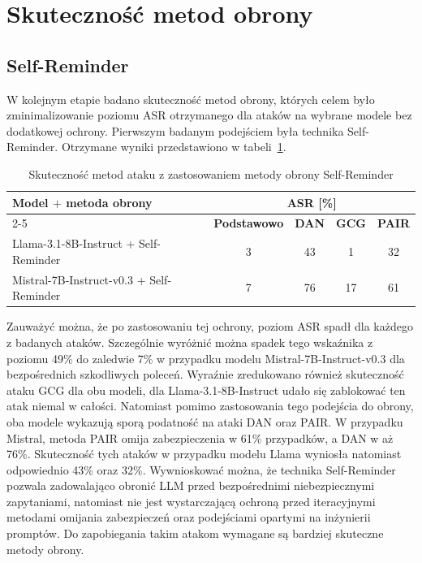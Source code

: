 \section{Skuteczność metod obrony}
\subsection{Self-Reminder}
W kolejnym etapie badano skuteczność metod obrony, których celem było zminimalizowanie poziomu \gls{ASR} otrzymanego dla ataków na wybrane modele bez dodatkowej ochrony. Pierwszym badanym podejściem była technika Self-Reminder. Otrzymane wyniki przedstawiono w tabeli~\ref{tab:self_reminder_comparison_tab}.
\begin{table}[!ht]
    \centering
    \renewcommand{\arraystretch}{1.2}
    \begin{tabular}{l|c|c|c|c}
        \hline
        \multirow{2}{*}{\textbf{Model $+$ metoda obrony}} & \multicolumn{4}{c}{\textbf{ASR [\%]}}                                               \\\cline{2-5}
                                                          & \textbf{Podstawowo}                   & \textbf{DAN} & \textbf{GCG} & \textbf{PAIR} \\\hline
        Llama-3.1-8B-Instruct + Self-Reminder             & 3                                     & 43           & 1            & 32            \\\hline
        Mistral-7B-Instruct-v0.3 + Self-Reminder          & 7                                     & 76           & 17           & 61            \\\hline
    \end{tabular}
    \caption{\label{tab:self_reminder_comparison_tab}Skuteczność metod ataku z zastosowaniem metody obrony Self-Reminder}
\end{table}
Zauważyć można, że po zastosowaniu tej ochrony, poziom \gls{ASR} spadł dla każdego z badanych ataków. Szczególnie wyróżnić można spadek tego wskaźnika z poziomu 49\% do zaledwie 7\% w przypadku modelu Mistral-7B-Instruct-v0.3 dla bezpośrednich szkodliwych poleceń. Wyraźnie zredukowano również skuteczność ataku \gls{GCG} dla obu modeli, dla Llama-3.1-8B-Instruct udało się zablokować ten atak niemal w całości. Natomiast pomimo zastosowania tego podejścia do obrony, oba modele wykazują sporą podatność na ataki \gls{DAN} oraz \gls{PAIR}. W przypadku Mistral, metoda \gls{PAIR} omija zabezpieczenia w 61\% przypadków, a \gls{DAN} w aż 76\%. Skuteczność tych ataków w przypadku modelu Llama wyniosła natomiast odpowiednio 43\% oraz 32\%. Wywnioskować można, że technika Self-Reminder pozwala zadowalająco obronić \gls{LLM} przed bezpośrednimi niebezpiecznymi zapytaniami, natomiast nie jest wystarczającą ochroną przed iteracyjnymi metodami omijania zabezpieczeń oraz podejściami opartymi na inżynierii promptów. Do zapobiegania takim atakom wymagane są bardziej skuteczne metody obrony.

